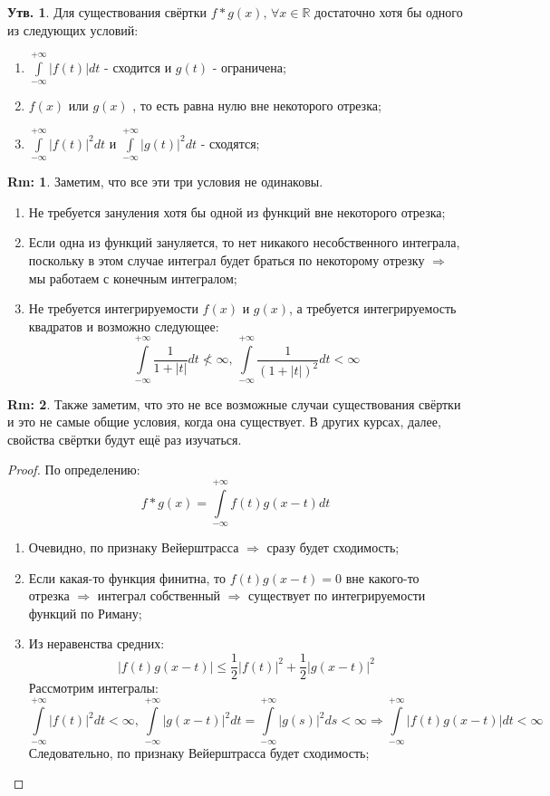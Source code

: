 \documentclass[12pt]{article}
\newcommand{\MR}{\mathbb{R}}
\theoremstyle{definition}
\newtheorem{rem}{Rm:}
\newtheorem{prop}{Утв.}
\newcommand{\ddint}[2]{\displaystyle\int\limits_{#1}^{#2}}
\begin{document}
\begin{prop}
	Для существования свёртки $f*g(x), \, \forall x \in \MR$ достаточно хотя бы одного из следующих условий:
	\begin{enumerate}[label=(\arabic*)]
		\item $\ddint{-\infty}{+\infty}|f(t)|dt$ -  сходится и $g(t)$ - ограничена;
		\item $f(x)$ или $g(x)$ , то есть равна нулю вне некоторого отрезка;
		\item $\ddint{-\infty}{+\infty}|f(t)|^2dt$ и $\ddint{-\infty}{+\infty}|g(t)|^2dt$ - сходятся;
	\end{enumerate}
\end{prop}
\begin{rem}
	Заметим, что все эти три условия не одинаковы. 
	\begin{enumerate}[label=(\arabic*)]
		\item Не требуется зануления хотя бы одной из функций вне некоторого отрезка;
		\item Если одна из функций зануляется, то нет никакого несобственного интеграла, поскольку в этом случае интеграл будет браться по некоторому отрезку $\Rightarrow$ мы работаем с конечным интегралом;
		\item Не требуется интегрируемости $f(x)$ и $g(x)$, а требуется интегрируемость квадратов и возможно следующее:
		$$
			\ddint{-\infty}{+\infty}\dfrac{1}{1 + |t|}dt \not< \infty, \, \ddint{-\infty}{+\infty}\dfrac{1}{(1 + |t|)^2}dt < \infty
		$$
	\end{enumerate}
\end{rem}
\begin{rem}
	Также заметим, что это не все возможные случаи существования свёртки и это не самые общие условия, когда она существует. В других курсах, далее, свойства свёртки будут ещё раз изучаться.
\end{rem}
\begin{proof}
	По определению:
	$$
		f*g(x) = \ddint{-\infty}{+\infty}f(t)g(x-t)dt
	$$
	\begin{enumerate}[label=(\arabic*)]
		\item Очевидно, по признаку Вейерштрасса $\Rightarrow$ сразу будет сходимость;
		\item Если какая-то функция финитна, то $f(t)g(x - t) = 0$ вне какого-то отрезка $\Rightarrow$ интеграл собственный $\Rightarrow$ существует по интегрируемости функций по Риману;
		\item Из неравенства средних:
		$$
			|f(t)g(x - t)| \leq \dfrac{1}{2}|f(t)|^2 + \dfrac{1}{2}|g(x - t)|^2
		$$ 
		Рассмотрим интегралы:
		$$
			\ddint{-\infty}{+\infty}|f(t)|^2dt < \infty, \, \ddint{-\infty}{+\infty}|g(x - t)|^2dt = \ddint{-\infty}{+\infty}|g(s)|^2ds < \infty \Rightarrow \ddint{-\infty}{+\infty}|f(t)g(x - t)|dt < \infty
		$$
		Следовательно, по признаку Вейерштрасса будет сходимость;
	\end{enumerate}
\end{proof}
\end{document}
